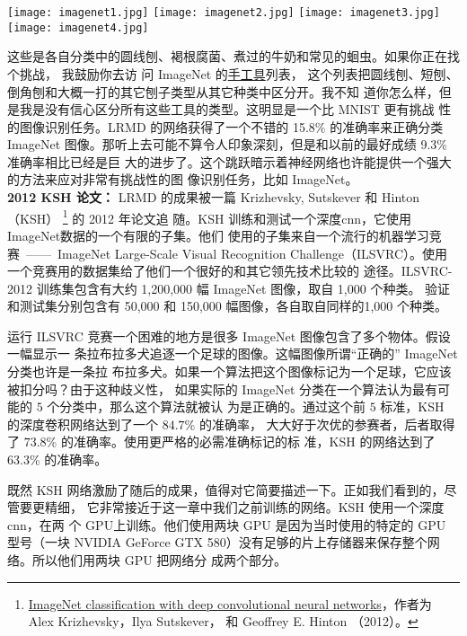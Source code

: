 \begin{center}
  \texttt{[image: imagenet1.jpg]}%
  \texttt{[image: imagenet2.jpg]}%
  \texttt{[image: imagenet3.jpg]}%
  \texttt{[image: imagenet4.jpg]}
\end{center}

这些是各自分类中的圆线刨、褐根腐菌、煮过的牛奶和常见的蛔虫。如果你正在找个挑战，
我鼓励你去访
问 ImageNet 的\href{http://www.image-net.org/synset?wnid=n03489162}{手工具}列表，
这个列表把圆线刨、短刨、倒角刨和大概一打的其它刨子类型从其它种类中区分开。我不知
道你怎么样，但是我是没有信心区分所有这些工具的类型。这明显是一个比 MNIST 更有挑战
性的图像识别任务。LRMD 的网络获得了一个不错的 15.8\% 的准确率来正确分类 ImageNet
图像。那听上去可能不算令人印象深刻，但是和以前的最好成绩 9.3\% 准确率相比已经是巨
大的进步了。这个跳跃暗示着神经网络也许能提供一个强大的方法来应对非常有挑战性的图
像识别任务，比如 ImageNet。\\

\textbf{2012 KSH 论文：} LRMD 的成果被一篇 Krizhevsky,
Sutskever 和 Hinton （KSH）
\footnote{\href{http://www.cs.toronto.edu/~fritz/absps/imagenet.pdf}{ImageNet
    classification with deep convolutional neural networks}，作者为 Alex
  Krizhevsky，Ilya Sutskever， 和 Geoffrey E. Hinton （2012）。} 的 2012 年论文追
随。KSH 训练和测试一个深度\gls*{cnn}，它使用 ImageNet数据的一个有限的子集。他们
使用的子集来自一个流行的机器学习竞赛~——~ImageNet Large-Scale Visual Recognition
Challenge（ILSVRC）。使用一个竞赛用的数据集给了他们一个很好的和其它领先技术比较的
途径。ILSVRC-2012 训练集包含有大约 1,200,000 幅 ImageNet 图像，取自 1,000 个种类。
验证和测试集分别包含有 50,000 和 150,000 幅图像，各自取自同样的1,000 个种类。

运行 ILSVRC 竞赛一个困难的地方是很多 ImageNet 图像包含了多个物体。假设一幅显示一
条拉布拉多犬追逐一个足球的图像。这幅图像所谓“正确的” ImageNet 分类也许是一条拉
布拉多犬。如果一个算法把这个图像标记为一个足球，它应该被扣分吗？由于这种歧义性，
如果实际的 ImageNet 分类在一个算法认为最有可能的 $5$ 个分类中，那么这个算法就被认
为是正确的。通过这个前 $5$ 标准，KSH 的深度卷积网络达到了一个 $84.7$\% 的准确率，
大大好于次优的参赛者，后者取得了 $73.8$\% 的准确率。使用更严格的必需准确标记的标
准，KSH 的网络达到了 $63.3$\% 的准确率。

既然 KSH 网络激励了随后的成果，值得对它简要描述一下。正如我们看到的，尽管要更精细，
它非常接近于这一章中我们之前训练的网络。KSH 使用一个深度\gls*{cnn}，在两
个 GPU上训练。他们使用两块 GPU 是因为当时使用的特定的 GPU 型号（一块 NVIDIA
GeForce GTX 580）没有足够的片上存储器来保存整个网络。所以他们用两块 GPU 把网络分
成两个部分。

